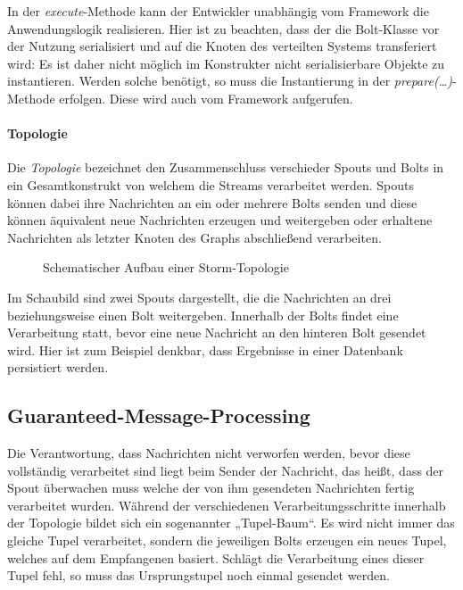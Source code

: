 \documentclass[a4paper,11pt]{scrartcl}
\begin{document}
  In der \textit{execute}-Methode kann der Entwickler unabhängig vom
  Framework die Anwendungslogik realisieren. Hier ist zu beachten,
  dass der die Bolt-Klasse vor der Nutzung serialisiert und auf die
  Knoten des verteilten Systems transferiert wird: Es ist daher nicht
  möglich im Konstrukter nicht serialisierbare Objekte zu instantieren.
  Werden solche benötigt, so muss die Instantierung in der
  \textit{prepare(\ldots)}-Methode erfolgen. Diese wird auch vom
  Framework aufgerufen.

  \paragraph{Topologie}
  Die \textit{Topologie} bezeichnet den Zusammenschluss verschieder
  Spouts und Bolts in ein Gesamtkonstrukt von welchem die Streams
  verarbeitet werden. Spouts können dabei ihre Nachrichten an ein oder
  mehrere Bolts senden und diese können äquivalent neue Nachrichten
  erzeugen und weitergeben oder erhaltene Nachrichten als letzter
  Knoten des Graphs abschließend verarbeiten.

  \begin{figure}[!h]
    \center
    \scalebox{.7}{}
    \caption{Schematischer Aufbau einer Storm-Topologie}
    \label{fig:topology}
  \end{figure}

  Im Schaubild sind zwei Spouts dargestellt, die die Nachrichten an
  drei beziehungsweise einen Bolt weitergeben. Innerhalb der Bolts
  findet eine Verarbeitung statt, bevor eine neue Nachricht an den
  hinteren Bolt gesendet wird. Hier ist zum Beispiel denkbar, dass
  Ergebnisse in einer Datenbank persistiert werden.

  \subsection{Guaranteed-Message-Processing}
  Die Verantwortung, dass Nachrichten nicht verworfen werden, bevor
  diese vollständig verarbeitet sind liegt beim Sender der Nachricht,
  das heißt, dass der Spout überwachen muss welche der von ihm
  gesendeten Nachrichten fertig verarbeitet wurden. Während der
  verschiedenen Verarbeitungsschritte innerhalb der Topologie bildet
  sich ein sogenannter „Tupel-Baum“. Es wird nicht immer das gleiche
  Tupel verarbeitet, sondern die jeweiligen Bolts erzeugen ein neues
  Tupel, welches auf dem Empfangenen basiert. Schlägt die Verarbeitung
  eines dieser Tupel fehl, so muss das Ursprungstupel noch einmal
  gesendet werden.\cite{stormguaranteedprocessing}
\end{document}
